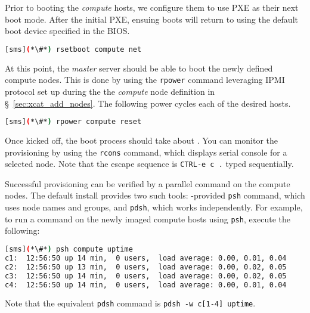 Prior to booting the {\em compute} hosts, we configure them to use PXE as their
next boot mode. After the initial PXE, ensuing boots will return to using the default boot device
specified in the BIOS.

\begin{lstlisting}[language=bash,keywords={},upquote=true]
[sms](*\#*) rsetboot compute net
\end{lstlisting} 

At this point, the {\em master} server should be able to boot the newly defined
compute nodes. This is done by using the \texttt{rpower} \xCAT{} command
leveraging IPMI protocol set up during the the {\em compute} node definition
in \S~\ref{sec:xcat_add_nodes}. The following power cycles each of the
desired hosts.


\begin{lstlisting}[language=bash,keywords={},upquote=true]
[sms](*\#*) rpower compute reset
\end{lstlisting} 

Once kicked off, the boot process should take about .  You can monitor the
provisioning by using the \texttt{rcons} command, which displays serial console
for a selected node. Note that the escape sequence
is \texttt{CTRL-e c .} typed sequentially. 

Successful provisioning can be verified by a parallel command on the compute
nodes. The default install provides two such tools: \xCAT{}-provided
\texttt{psh} command, which uses \xCAT{} node names and groups,
and \texttt{pdsh}, which works independently.  For example, to run a command on
the newly imaged compute hosts using \texttt{psh}, execute the following:

\begin{lstlisting}[language=bash]
[sms](*\#*) psh compute uptime
c1:  12:56:50 up 14 min,  0 users,  load average: 0.00, 0.01, 0.04
c2:  12:56:50 up 13 min,  0 users,  load average: 0.00, 0.02, 0.05
c3:  12:56:50 up 14 min,  0 users,  load average: 0.00, 0.02, 0.05
c4:  12:56:50 up 14 min,  0 users,  load average: 0.00, 0.01, 0.04
\end{lstlisting}
Note that the equivalent \texttt{pdsh} command is \texttt{pdsh -w c[1-4] uptime}. 
